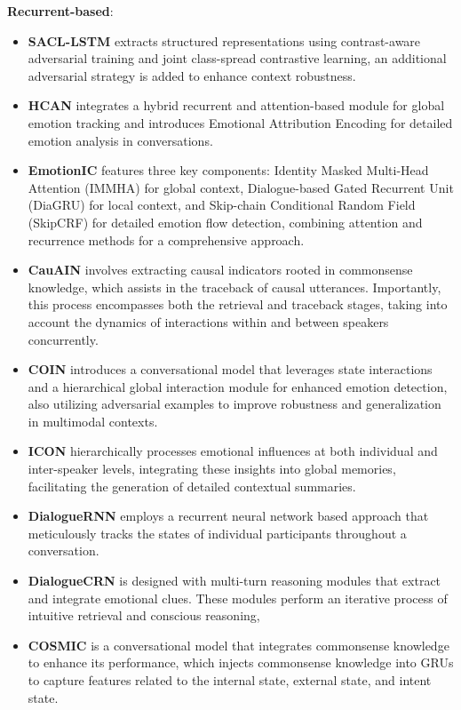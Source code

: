 \documentclass[conference]{IEEEtran}
\begin{document}
\textbf{Recurrent-based}:
\begin{itemize}
\item \textbf{SACL-LSTM} \cite{hu2023supervised} extracts structured representations using contrast-aware adversarial training and joint class-spread contrastive learning, an additional adversarial strategy is added to enhance context robustness. 
\item \textbf{HCAN} \cite{lei2023watch} integrates a hybrid recurrent and attention-based module for global emotion tracking and introduces Emotional Attribution Encoding for detailed emotion analysis in conversations. 
\item \textbf{EmotionIC} \cite{yingjian2023emotionic} features three key components: Identity Masked Multi-Head Attention (IMMHA) for global context, Dialogue-based Gated Recurrent Unit (DiaGRU) for local context, and Skip-chain Conditional Random Field (SkipCRF) for detailed emotion flow detection, combining attention and recurrence methods for a comprehensive approach.
\item \textbf{CauAIN} \cite{zhao2022cauain} involves extracting causal indicators rooted in commonsense knowledge, which assists in the traceback of causal utterances. Importantly, this process encompasses both the retrieval and traceback stages, taking into account the dynamics of interactions within and between speakers concurrently.
\item \textbf{COIN} \cite{zhang2021coin} introduces a conversational model that leverages state interactions and a hierarchical global interaction module for enhanced emotion detection, also utilizing adversarial examples to improve robustness and generalization in multimodal contexts.
\item \textbf{ICON} \cite{hazarika2018icon} hierarchically processes emotional influences at both individual and inter-speaker levels, integrating these insights into global memories, facilitating the generation of detailed contextual summaries.
\item \textbf{DialogueRNN} \cite{majumder2019dialoguernn} employs a recurrent neural network based approach that meticulously tracks the states of individual participants throughout a conversation. 
\item \textbf{DialogueCRN} \cite{DBLP:conf/acl/HuWH20} is designed with multi-turn reasoning modules that extract and integrate emotional clues. These modules perform an iterative process of intuitive retrieval and conscious reasoning, 
\item \textbf{COSMIC} \cite{ghosal2020cosmic} is a conversational model that integrates commonsense knowledge to enhance its performance, which injects commonsense knowledge into GRUs to capture features related to the internal state, external state, and intent state.
\end{itemize}
\end{document}

